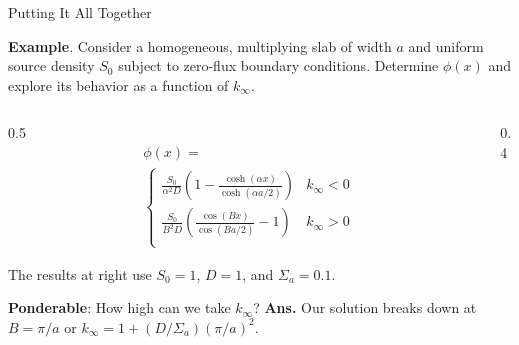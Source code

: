 \documentclass[aspectratio=1610]{beamer}
\begin{document}
\begin{frame}[fragile]{Putting It All Together}
 
{\bf Example}.  Consider a homogeneous, multiplying slab of width $a$ and uniform 
source density $S_0$ subject to zero-flux
boundary conditions.  Determine $\phi(x)$ and explore its behavior as a function of 
$k_{\infty}$.  

\vfill 


\begin{columns}[T]


\begin{column}{0.5\textwidth}
{\small 
\begin{align*}
 &\phi(x) = \\
 &\begin{cases}
       \frac{S_0}{\alpha^2 D}\left ( 1-\frac{\cosh(\alpha x)}{\cosh(\alpha a/2)} \right ) & k_{\infty} < 0 \\      
      \frac{S_0}{B^2 D}\left ( \frac{\cos(B x)}{\cos(B a/2)} - 1 \right ) & k_{\infty} > 0 \\      
 \end{cases}
\end{align*}
}

The results at right use $S_0 = 1$, $D=1$, and $\Sigma_a = 0.1$.\\

\vspace{0.25cm}


{\bf Ponderable}: How high can we take $k_{\infty}$?
\pause 
{\small {\bf Ans.}  Our solution breaks down at $B = \pi/a$ or $k_{\infty} = 1 + (D/\Sigma_a)(\pi/a)^2$. }

\end{column}


\begin{column}{0.4\textwidth}

\resizebox{0.95\textwidth}{!}{}

\end{column}

\end{columns}
 
\end{frame}
\end{document}
